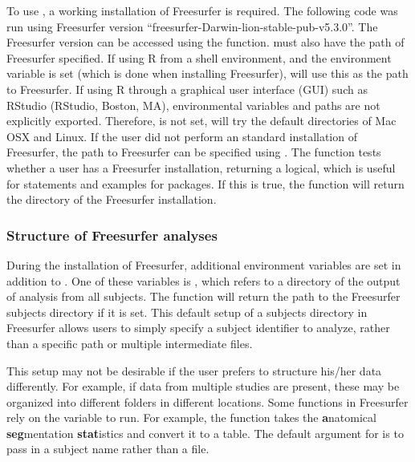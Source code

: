 To use , a working installation of Freesurfer is
required. The following code was run using Freesurfer version
``freesurfer-Darwin-lion-stable-pub-v5.3.0''. The Freesurfer version can
be accessed using the  function.  must
also have the path of Freesurfer specified. If using R from a shell
environment, and the  environment variable is set
(which is done when installing Freesurfer),  will use
this as the path to Freesurfer. If using R through a graphical user
interface (GUI) such as RStudio (RStudio, Boston, MA), environmental
variables and paths are not explicitly exported. Therefore,
 is not set,  will try the
default directories of Mac OSX and Linux. If the user did not perform an
standard installation of Freesurfer, the path to Freesurfer can be
specified using .
The  function tests whether a user has a Freesurfer
installation, returning a logical, which is useful for 
statements and examples for packages. If this is true, the
 function will return the directory of the Freesurfer
installation.

\subsubsection{Structure of Freesurfer
analyses}\label{structure-of-freesurfer-analyses}

During the installation of Freesurfer, additional environment variables
are set in addition to . One of these variables
is , which refers to a directory of the output of
analysis from all subjects. The  function will
return the path to the Freesurfer subjects directory if it is set. This
default setup of a subjects directory in Freesurfer allows users to
simply specify a subject identifier to analyze, rather than a specific
path or multiple intermediate files.

This setup may not be desirable if the user prefers to structure his/her
data differently. For example, if data from multiple studies are
present, these may be organized into different folders in different
locations. Some functions in Freesurfer rely on the 
variable to run. For example, the  function takes
the \textbf{a}natomical \textbf{seg}mentation \textbf{stat}istics and
convert it to a table. The default argument for 
is to pass in a subject name rather than a file.

